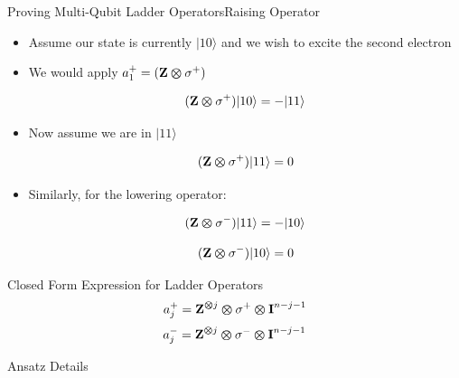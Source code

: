 \begin{frame}{Proving Multi-Qubit Ladder Operators}{Raising Operator}
    \begin{itemize}
        \item Assume our state is currently $|10\rangle$ and we wish to excite the second electron
        \item We would apply $a_1^+ = (\mbox{\bfseries{\textrm{Z}}} \bm{\otimes} \sigma^+)$

        \[(\mbox{\bfseries{\textrm{Z}}} \bm{\otimes} \sigma^+ )|10\rangle = - |11\rangle\]

        \item Now assume we are in $|11\rangle$

        \[(\mbox{\bfseries{\textrm{Z}}} \bm{\otimes} \sigma^+ )|11\rangle = 0\]
        \item Similarly, for the lowering operator: 

        \[(\mbox{\bfseries{\textrm{Z}}} \bm{\otimes} \sigma^-) |11\rangle = -|10\rangle\]

        \[(\mbox{\bfseries{\textrm{Z}}} \bm{\otimes} \sigma^-) |10\rangle = 0\]
    \end{itemize}
\end{frame}

\begin{frame}{Closed Form Expression for Ladder Operators}
    \begin{equation}
        a_j^+ = \mbox{\bfseries{\textrm{Z}}}^{\bm{\otimes} j}\bm{\otimes} \sigma^+ \bm{\otimes} \mbox{\bfseries{\textrm{I}}}^{n-j-1}
    \end{equation}
    \begin{equation}
        a_j^- = \mbox{\bfseries{\textrm{Z}}}^{\bm{\otimes} j}\bm{\otimes} \sigma^- \bm{\otimes} \mbox{\bfseries{\textrm{I}}}^{n-j-1}
    \end{equation}
\end{frame}

\begin{frame}{Ansatz Details}
    
\end{frame}
    








